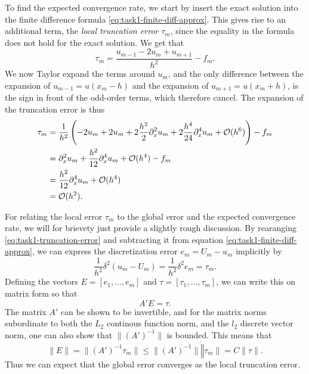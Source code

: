To find the expected convergence rate, we start by insert the exact solution into the finite difference formula \eqref{eq:task1-finite-diff-approx}. 
This gives rise to an additional term, 
the \textit{local truncation error} $\tau_m$, 
since the equality in the formula does not hold for the exact solution. 
We get that 
\begin{equation}
    \tau_m = \frac{u_{m-1}-2u_m+u_{m+1}}{h^2} - f_m. 
    \label{eq:task1-truncation-error}
\end{equation}
We now Taylor expand the terms around $u_m$, 
and the only difference between the expansion of $u_{m-1} = u(x_m - h)$ and the expansion of $u_{m+1}=u(x_m+h)$, 
is the sign in front of the odd-order terms, which therefore cancel. 
The expansion of the truncation error is thus 
\begin{align*}
    \tau_m & = \frac{1}{h^2}\left(-2u_m + 2u_m + 2\frac{h^2}{2}\partial_x^2 u_m + 2\frac{h^4}{24}\partial_x^4 u_m + \mathcal{O}(h^6) \right) - f_m\\
           & = \partial_x^2 u_m + \frac{h^2}{12}\partial_x^4 u_m + \mathcal{O}(h^4) - f_m \\
           & = \frac{h^2}{12}\partial_x^4 u_m + \mathcal{O}(h^4) \\
           & = \mathcal{O}(h^2). 
\end{align*} 

For relating the local error $\tau_m$ to the global error and the expected convergence rate, 
we will for brievety just provide a slightly rough discussion. 
By rearanging \eqref{eq:task1-truncation-error} and subtracting it from equation \eqref{eq:task1-finite-diff-approx}, 
we can express the discretization error $e_m = U_m - u_m$ implicitly by 
\begin{equation*}
    \frac{1}{h^2}\delta^2(u_{m} - U_m) = \frac{1}{h^2}\delta^2e_m = \tau_m. 
\end{equation*}
Defining the vectors $E = [e_1, \dots, e_m]$ and $\tau = [\tau_1, \dots, \tau_m]$, 
we can write this on matrix form so that 
\begin{equation*}
    A'E = \tau. 
\end{equation*}
The matrix $A'$ can be shown to be invertible, 
and for the matrix norms subordinate to both the $L_2$ continous function norm, and the $l_2$ discrete vector norm, 
one can also show that $\|(A')^{-1}\|$ is bounded. 
This means that 
\begin{equation*}
    \|E\| = \| (A')^{-1} \tau_m \| \leq \| (A')^{-1} \| \dot \| \tau_m \| = C\|\tau\|. 
\end{equation*}
Thus we can expect that the global error converges as the local truncation error. 

